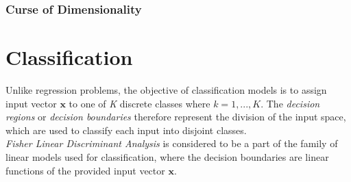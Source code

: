 \documentclass[12pt,twoside,a4paper]{article}
\begin{document}
\subsubsection{Curse of Dimensionality}

\pagebreak
\section{Classification}
Unlike regression problems, the objective of classification models is to assign input vector $\textbf{x}$ to one of \textit{K} discrete classes where $k = 1,...,K$. The \textit{decision regions} or \textit{decision boundaries} therefore represent the division of the input space, which are used to classify each input into disjoint classes.\\
\textit{Fisher Linear Discriminant Analysis} is considered to be a part of the family of linear models used for classification, where the decision boundaries are linear functions of the provided input vector $\textbf{x}$.
\end{document}

